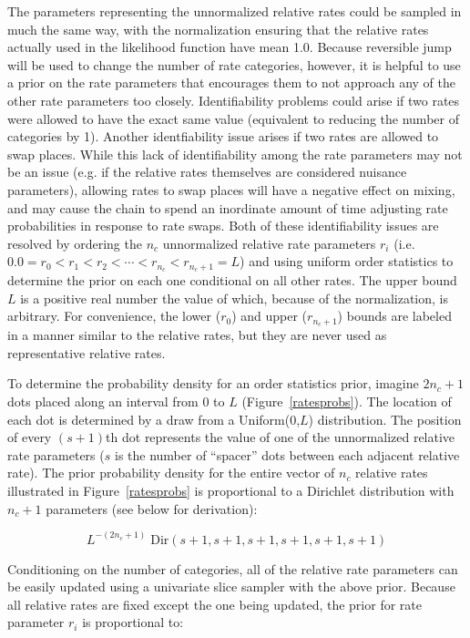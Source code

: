 \documentclass[12pt]{article}
\newcommand{\ncat}{n_c}
\begin{document}
The parameters representing the unnormalized relative rates could be sampled in much the same way, with the normalization ensuring that the relative rates actually used in the likelihood function have mean 1.0. Because reversible jump will be used to change the number of rate categories, however, it is helpful to use a prior on the rate parameters that encourages them to not approach any of the other rate parameters too closely. Identifiability problems could arise if two rates were allowed to have the exact same value (equivalent to reducing the number of categories by 1). Another identfiability issue arises if two rates are allowed to swap places. While this lack of identifiability among the rate parameters may not be an issue (e.g. if the relative rates themselves are considered nuisance parameters), allowing rates to swap places will have a negative effect on mixing, and may cause the chain to spend an inordinate amount of time adjusting rate probabilities in response to rate swaps. Both of these identifiability issues are resolved by ordering the $\ncat$ unnormalized relative rate parameters $r_i$ (i.e. $0.0 = r_0 < r_1 < r_2 < \cdots < r_{\ncat} < r_{\ncat+1} = L$) and using uniform order statistics to determine the prior on each one conditional on all other rates. The upper bound $L$ is a positive real number the value of which, because of the normalization, is arbitrary. For convenience, the lower ($r_0$) and upper ($r_{\ncat+1}$) bounds are labeled in a manner similar to the relative rates, but they are never used as representative relative rates.

To determine the probability density for an order statistics prior, imagine $2 \ncat + 1$ dots placed along an interval from 0 to $L$ (Figure~\ref{ratesprobs}). The location of each dot is determined by a draw from a Uniform(0,$L$) distribution. The position of every $(s+1)$th dot represents the value of one of the unnormalized relative rate parameters ($s$ is the number of ``spacer'' dots between each adjacent relative rate). The prior probability density for the entire vector of $\ncat$ relative rates illustrated in Figure~\ref{ratesprobs} is proportional to a Dirichlet distribution with $\ncat+1$ parameters (see below for derivation):

\[ L^{-(2\ncat+1)} \; \mbox{Dir}(s+1, s+1, s+1, s+1, s+1, s+1) \]

Conditioning on the number of categories, all of the relative rate parameters can be easily updated using a univariate slice sampler with the above prior. Because all relative rates are fixed except the one being updated, the prior for rate parameter $r_i$ is proportional to:
\end{document}
